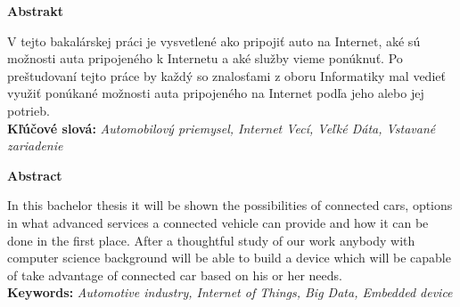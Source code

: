 {\noindent\large\bf Abstrakt}

\vspace{1.8cm}

V tejto bakalárskej práci je vysvetlené ako pripojiť auto na Internet, aké sú možnosti auta pripojeného k Internetu a aké služby vieme ponúknuť. Po preštudovaní tejto práce by každý so znalosťami z oboru Informatiky mal vedieť využiť ponúkané možnosti auta pripojeného na Internet podľa jeho alebo jej potrieb.
\\

{\parindent0pt \textbf{Kľúčové slová:} \emph{Automobilový priemysel, Internet Vecí, Veľké Dáta, Vstavané zariadenie}} 

\newpage
 {\noindent\large\bf Abstract}
  \vspace{1.8cm}
 
 In this bachelor thesis it will be shown the possibilities of connected cars, options in what advanced services a connected vehicle can provide and how it can be done in the first place. After a thoughtful study of our work anybody with computer science background will be able to build a device which will be capable of take advantage of connected car based on his or her needs.\\

{\parindent0pt \textbf{Keywords:} \emph{Automotive industry, Internet of Things, Big Data, Embedded device}}


\newpage
